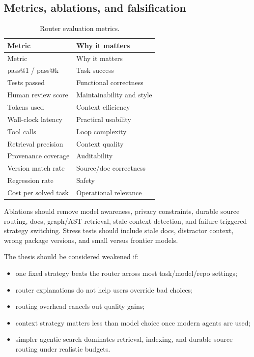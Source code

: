 \documentclass[
  11pt,
  letterpaper,
  numbers=noendperiod,
  parskip=half]{scrartcl}
\providecommand{\tightlist}{%
  \setlength{\itemsep}{0pt}\setlength{\parskip}{0pt}}
\begin{document}
\subsection{Metrics, ablations, and
falsification}\label{sec-eval-metrics}

\begin{longtable}[]{@{}ll@{}}
\caption{Router evaluation
metrics.}\label{tbl-eval-metrics}\tabularnewline
\toprule\noalign{}
Metric & Why it matters \\
\midrule\noalign{}
\endfirsthead
\toprule\noalign{}
Metric & Why it matters \\
\midrule\noalign{}
\endhead
\bottomrule\noalign{}
\endlastfoot
pass@1 / pass@k & Task success \\
Tests passed & Functional correctness \\
Human review score & Maintainability and style \\
Tokens used & Context efficiency \\
Wall-clock latency & Practical usability \\
Tool calls & Loop complexity \\
Retrieval precision & Context quality \\
Provenance coverage & Auditability \\
Version match rate & Source/doc correctness \\
Regression rate & Safety \\
Cost per solved task & Operational relevance \\
\end{longtable}

Ablations should remove model awareness, privacy constraints, durable
source routing, docs, graph/AST retrieval, stale-context detection, and
failure-triggered strategy switching. Stress tests should include stale
docs, distractor context, wrong package versions, and small versus
frontier models.

The thesis should be considered weakened if:

\begin{itemize}
\tightlist
\item
  one fixed strategy beats the router across most task/model/repo
  settings;
\item
  router explanations do not help users override bad choices;
\item
  routing overhead cancels out quality gains;
\item
  context strategy matters less than model choice once modern agents are
  used;
\item
  simpler agentic search dominates retrieval, indexing, and durable
  source routing under realistic budgets.
\end{itemize}
\end{document}
